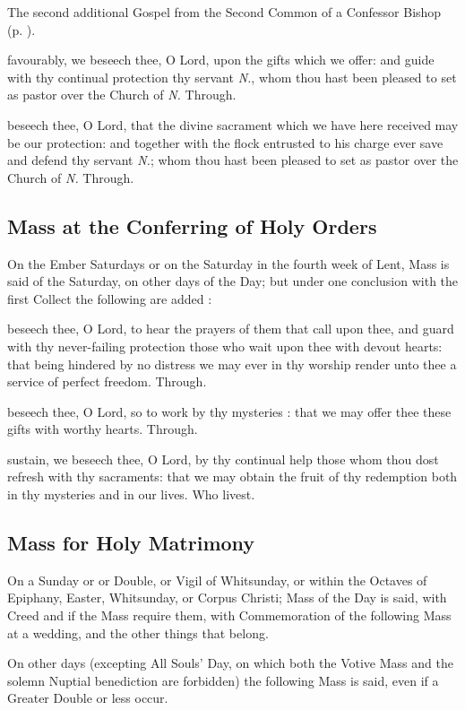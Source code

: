 \begin{rubric}
	The second additional Gospel from the Second Common of a Confessor Bishop (p. \pageref{Mark1333}).
\end{rubric}

\secret
{} favourably, we beseech thee, O Lord, upon the gifts which we offer: and guide with thy continual protection thy servant \textit{N.}, whom thou hast been pleased to set as pastor over the Church of \textit{N.} Through.

\postcommunion
{} beseech thee, O Lord, that the divine sacrament which we have here received may be our protection: and together with the flock entrusted to his charge ever save and defend thy servant \textit{N.}; whom thou hast been pleased to set as pastor over the Church of \textit{N.} Through.


\clearpage
\subsection{Mass at the Conferring of Holy Orders}
\begin{rubric}
	On the Ember Saturdays or on the Saturday in the fourth week of Lent, Mass is said of the Saturday, on other days of the Day; but under one conclusion with the first Collect the following are added :
\end{rubric}

\collect
{} beseech thee, O Lord, to hear the prayers of them that call upon thee, and guard with thy never-failing protection those who wait upon thee with devout hearts: that being hindered by no distress we may ever in thy worship render unto thee a service of perfect freedom. Through.

\secret
{} beseech thee, O Lord, so to work by thy mysteries : that we may offer thee these gifts with worthy hearts. Through.

\postcommunion
{} sustain, we beseech thee, O Lord, by thy continual help those whom thou dost refresh with thy sacraments: that we may obtain the fruit of thy redemption both in thy mysteries and in our lives. Who livest.


\clearpage
\subsection{Mass for Holy Matrimony}\label{MatrimonyMass}
\begin{rubric}
    On a Sunday or  or  Double, or Vigil of Whitsunday, or within the Octaves of Epiphany, Easter, Whitsunday, or Corpus Christi; Mass of the Day is said, with Creed and  if the Mass require them, with Commemoration of the following Mass at a wedding, and the other things that belong.\par
    On other days (excepting All Souls' Day, on which both the Votive Mass and the solemn Nuptial benediction are forbidden) the following Mass is said, even if a Greater Double or less occur.
\end{rubric}


